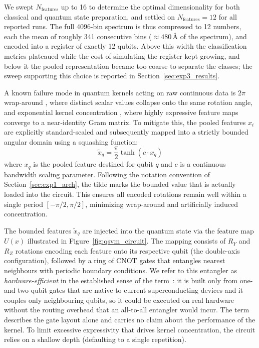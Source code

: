 We swept $N_{\text{features}}$ up to 16 to determine the optimal dimensionality for both
classical and quantum state preparation, and settled on $N_{\text{features}} = 12$ for all
reported runs. The full 4096-bin spectrum is thus compressed to 12 numbers, each the mean
of roughly 341 consecutive bins ($\approx 480$\,\AA{} of the spectrum), and encoded into a
register of exactly 12 qubits. Above this width the classification metrics plateaued while
the cost of simulating the register kept growing, and below it the pooled representation
became too coarse to separate the classes; the sweep supporting this choice is reported in
Section~\ref{sec:exp3_results}.

A known failure mode in quantum kernels acting on raw continuous data is $2\pi$ wrap-around \cite{Bosco2025Periodic}, where distinct scalar values collapse onto the same rotation angle, and exponential kernel concentration \cite{thanasilp2024Exponential}, where highly expressive feature maps converge to a near-identity Gram matrix. To mitigate this, the pooled features $x_i$ are explicitly standard-scaled and subsequently mapped into a strictly bounded angular domain using a squashing function:
$$ \tilde{x}_q = \frac{\pi}{2} \tanh(c \cdot x_q) $$
where $x_q$ is the pooled feature destined for qubit $q$ and $c$ is a continuous bandwidth
scaling parameter. Following the notation convention of Section~\ref{sec:exp1_arch}, the
tilde marks the bounded value that is actually loaded into the circuit. This ensures all
encoded rotations remain well within a single period $[-\pi/2, \pi/2]$, minimizing
wrap-around and artificially induced concentration.

The bounded features $\tilde{x}_q$ are injected into the quantum state via the feature map
$U(x)$ illustrated in Figure~\ref{fig:qsvm_circuit}. The mapping consists of $R_Y$ and
$R_Z$ rotations encoding each feature onto its respective qubit (the double-axis
configuration), followed by a ring of CNOT gates that entangles nearest neighbours with
periodic boundary conditions. We refer to this entangler as \emph{hardware-efficient} in
the established sense of the term~\cite{kandala2017hardware}: it is built only from
one- and two-qubit gates that are native to current superconducting devices and it couples
only neighbouring qubits, so it could be executed on real hardware without the routing
overhead that an all-to-all entangler would incur. The term describes the gate layout
alone and carries no claim about the performance of the kernel. To limit excessive
expressivity that drives kernel concentration, the circuit relies on a shallow depth
(defaulting to a single repetition).

